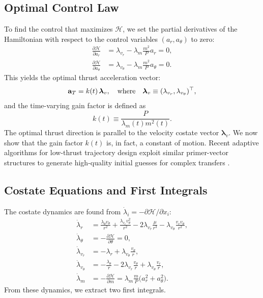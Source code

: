 \documentclass[journal, a4paper]{IEEEtran}
\begin{document}
\subsection{Optimal Control Law}
To find the control that maximizes $\mathcal{H}$, we set the partial derivatives of the Hamiltonian with respect to the control variables $(a_r, a_\theta)$ to zero:
\begin{subequations}
\begin{align}
    \frac{\partial\mathcal{H}}{\partial a_r} &= \lambda_{v_r} - \lambda_m \frac{m^2}{P} a_r = 0, \\
    \frac{\partial\mathcal{H}}{\partial a_\theta} &= \lambda_{v_\theta} - \lambda_m \frac{m^2}{P} a_\theta = 0.
\end{align}
\end{subequations}
This yields the optimal thrust acceleration vector:
\begin{equation}
  {\bf a}_T = k(t)\,\boldsymbol\lambda_v, \quad \text{where} \quad \boldsymbol\lambda_v \equiv (\lambda_{v_r},\lambda_{v_\theta})^\top,
  \label{eq:ThrustLaw_prelim}
\end{equation}
and the time-varying gain factor is defined as
\begin{equation}
    k(t) \equiv \frac{P}{\lambda_m(t) m^2(t)}.
    \label{eq:GainFactorDef}
\end{equation}
The optimal thrust direction is parallel to the velocity costate vector $\boldsymbol\lambda_v$. We now show that the gain factor $k(t)$ is, in fact, a constant of motion.
Recent adaptive algorithms for low-thrust trajectory design exploit similar primer-vector structures to generate high-quality initial guesses for complex transfers \cite{PinoHowell2020}.

\subsection{Costate Equations and First Integrals}
The costate dynamics are found from $\dot\lambda_i = -\partial\mathcal{H}/\partial x_i$:
\begin{subequations}\label{eq:CostateDyn}
\begin{align}
  \dot\lambda_r &=
      \frac{\lambda_\theta v_\theta}{r^{2}}
      +\frac{\lambda_{v_r} v_\theta^{2}}{r^{2}}
      -2\lambda_{v_r}\frac{\mu}{r^{3}}
      -\lambda_{v_\theta}\frac{v_r v_\theta}{r^{2}},
      \label{eq:lam_r}\\[4pt]
  \dot\lambda_\theta &= -\frac{\partial\mathcal{H}}{\partial\theta} = 0,
      \label{eq:lam_theta_deriv}\\[4pt]
  \dot\lambda_{v_r} &=
      -\lambda_r + \lambda_{v_\theta}\frac{v_\theta}{r},
      \label{eq:lam_vr}\\[4pt]
  \dot\lambda_{v_\theta} &=
      -\frac{\lambda_\theta}{r}
      -2\lambda_{v_r}\frac{v_\theta}{r}
      +\lambda_{v_\theta}\frac{v_r}{r},
      \label{eq:lam_vt}\\[4pt]
  \dot\lambda_m &= -\frac{\partial\mathcal{H}}{\partial m} =
      \lambda_m \frac{m}{P}\bigl(a_r^{2}+a_\theta^{2}\bigr).
      \label{eq:lam_m}
\end{align}
\end{subequations}
From these dynamics, we extract two first integrals.
\end{document}
